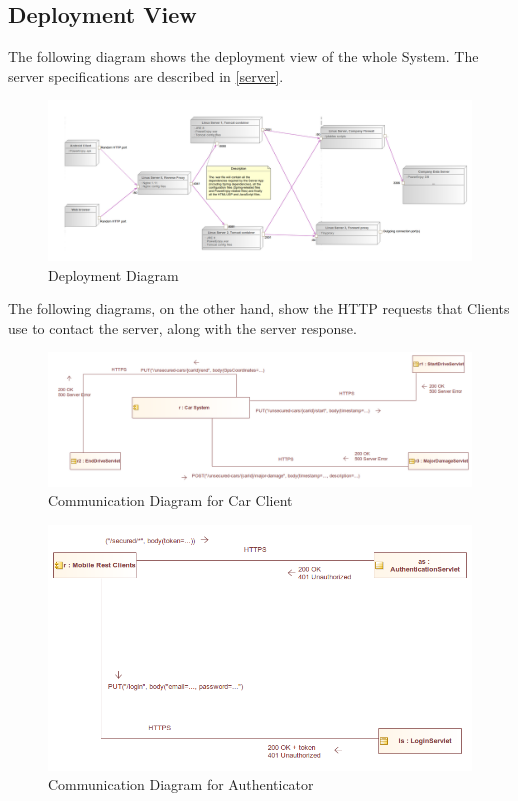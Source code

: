 \documentclass[12pt]{article}
\begin{document}
\subsection{Deployment View}
The following diagram shows the deployment view of the whole System. The server specifications are described in \ref{server}.
\begin{figure}[h]
	\centering
	\includegraphics[width=\textwidth]{../Images/Deployment}
	\caption{Deployment Diagram}
\end{figure}

The following diagrams, on the other hand, show the HTTP requests that Clients use to contact the server, along with the server response.

\begin{figure}[h]
	\centering
	\includegraphics[width=\textwidth]{../Images/CarClient_Communication}
	\caption{Communication Diagram for Car Client}
\end{figure}

\begin{figure}[h]
	\centering
	\includegraphics[width=\textwidth]{../Images/MobileAuth_Communication}
	\caption{Communication Diagram for Authenticator}
\end{figure}
\end{document}
